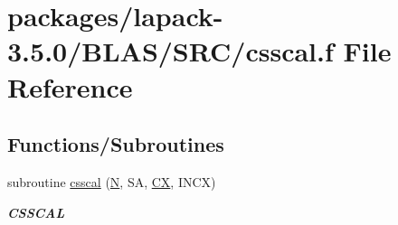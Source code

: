 \hypertarget{lapack-3_85_80_2BLAS_2SRC_2csscal_8f}{}\section{packages/lapack-\/3.5.0/\+B\+L\+A\+S/\+S\+R\+C/csscal.f File Reference}
\label{lapack-3_85_80_2BLAS_2SRC_2csscal_8f}
\subsection*{Functions/\+Subroutines}
\begin{DoxyCompactItemize}
\item 
subroutine \hyperlink{group__complex__blas__level1_ga7ac1991bb0c9da7b63fd64c999d6b859}{csscal} (\hyperlink{polmisc_8c_a0240ac851181b84ac374872dc5434ee4}{N}, S\+A, \hyperlink{scsum1_8c_a5a76da95c549c41790389a76e12fdcb5}{C\+X}, I\+N\+C\+X)
\begin{DoxyCompactList}\small\item\em {\bfseries C\+S\+S\+C\+A\+L} \end{DoxyCompactList}\end{DoxyCompactItemize}
